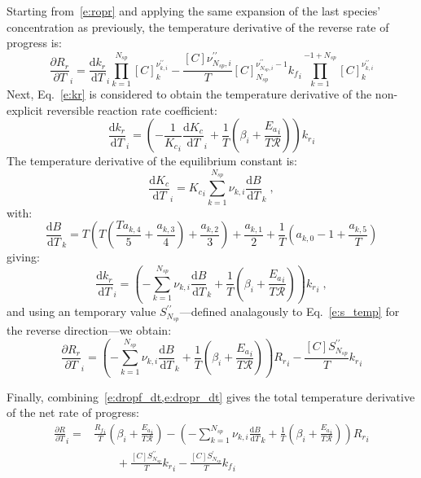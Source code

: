 \documentclass[12pt]{article}
\newcommand{\ns}{\ensuremath{{N_{sp}}}}
\newcommand{\Ru}{\ensuremath{\mathcal{R}}}
\begin{document}
Starting from~\cref{e:ropr} and applying the same expansion of the last species' concentration as previously, the temperature derivative of the reverse rate of progress is:
\begin{equation}
 \frac{\partial {R_r} }{\partial T }_{i} = \frac{\text{d} {k_r} }{\text{d} T }_{i} \prod_{k=1}^{\ns} [C]_{k}^{\nu^{\prime\prime}_{k,i}} - \frac{[C] \nu^{\prime\prime}_{\ns,i}}{T} [C]_{\ns}^{\nu^{\prime\prime}_{\ns,i} - 1} {k_f}_{i} \prod_{k=1}^{-1 + \ns} [C]_{k}^{\nu^{\prime\prime}_{k,i}}
\end{equation}
Next, Eq.~\cref{e:kr} is considered to obtain the temperature derivative of the non-explicit reversible reaction rate coefficient:
\begin{equation}
 \frac{\text{d} {k_r} }{\text{d} T }_{i} = \left(- \frac{1}{{K_c}_{i}} \frac{\text{d} {K_c} }{\text{d} T }_{i} + \frac{1}{T} \left(\beta_{i} + \frac{{E_{a}}_{i}}{T \Ru}\right)\right) {k_r}_{i}
\end{equation}
The temperature derivative of the equilibrium constant is:
\begin{equation}
 \frac{\text{d} {K_c} }{\text{d} T }_{i} = {K_c}_{i} \sum_{k=1}^{\ns} \nu_{k,i} \frac{\text{d} B }{\text{d} T }_{k} \;,
\end{equation}
with:
\begin{equation}
 \frac{\text{d} B }{\text{d} T }_{k} = T \left(T \left(\frac{T a_{k,4}}{5} + \frac{a_{k,3}}{4}\right) + \frac{a_{k,2}}{3}\right) + \frac{a_{k,1}}{2} + \frac{1}{T} \left(a_{k,0} - 1 + \frac{a_{k,5}}{T}\right)
\end{equation}
giving:
\begin{equation}
\label{e:dkr_dt}
\frac{\text{d} {k_r} }{\text{d} T }_{i} = \left(- \sum_{k=1}^{\ns} \nu_{k,i} \frac{\text{d} B }{\text{d} T }_{k} + \frac{1}{T} \left(\beta_{i} + \frac{{E_{a}}_{i}}{T \Ru}\right)\right) {k_r}_{i} \;,
\end{equation}
and using an temporary value $S^{\prime\prime}_{\ns}$---defined analagously to Eq.~\cref{e:s_temp} for the reverse direction---we obtain:
\begin{equation}
\label{e:dropr_dt}
\frac{\partial {R_r} }{\partial T }_{i} = \left(- \sum_{k=1}^{\ns} \nu_{k,i} \frac{\text{d} B }{\text{d} T }_{k} + \frac{1}{T} \left(\beta_{i} + \frac{{E_{a}}_{i}}{T \Ru}\right)\right) {R_r}_{i} - \frac{[C] S^{\prime\prime}_{\ns}}{T} {k_r}_{i}
\end{equation}

Finally, combining~\cref{e:dropf_dt,e:dropr_dt} gives the total temperature derivative of the net rate of progress:
\begin{align}
 \label{e:drop_dt}
 \frac{\partial R }{\partial T }_{i} =& \frac{{R_f}_{i}}{T} \left(\beta_{i} + \frac{{E_{a}}_{i}}{T \Ru}\right) - \left(- \sum_{k=1}^{\ns} \nu_{k,i} \frac{\text{d} B }{\text{d} T }_{k} + \frac{1}{T} \left(\beta_{i} + \frac{{E_{a}}_{i}}{T \Ru}\right)\right) {R_r}_{i} \nonumber \\
				      &\qquad + \frac{[C] S^{\prime\prime}_{\ns}}{T} {k_r}_{i} - \frac{[C] S^{\prime}_{\ns}}{T} {k_f}_{i}
\end{align}
\end{document}
